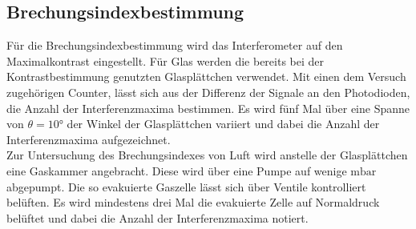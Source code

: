 \subsection{Brechungsindexbestimmung}
Für die Brechungsindexbestimmung wird das Interferometer auf den Maximalkontrast eingestellt. Für Glas werden die bereits bei der Kontrastbestimmung genutzten Glasplättchen verwendet.
Mit einen dem Versuch zugehörigen Counter, lässt sich aus der Differenz der Signale an den Photodioden, die Anzahl der Interferenzmaxima bestimmen. Es wird fünf Mal über eine Spanne von $\theta = 10°$ der Winkel der Glasplättchen
variiert und dabei die Anzahl der Interferenzmaxima aufgezeichnet.\\
Zur Untersuchung des Brechungsindexes von Luft wird anstelle der Glasplättchen eine Gaskammer angebracht. Diese wird über eine Pumpe auf wenige $\si{\milli\bar}$ abgepumpt. Die so evakuierte Gaszelle lässt sich
über Ventile kontrolliert belüften. Es wird mindestens drei Mal die evakuierte Zelle auf Normaldruck belüftet und dabei die Anzahl der Interferenzmaxima notiert.
